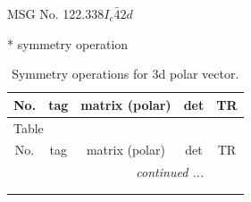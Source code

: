 \documentclass[fleqn,8pt]{jsarticle}
\begin{document}
\setcounter{MaxMatrixCols}{32}

\renewcommand{\tablename}{Table~}
\renewcommand{\figurename}{Figure~}
\begin{center}
\LARGE
MSG No. 122.338\quad$I_{c}\bar{4}2d$
\end{center}
* symmetry operation
\renewcommand{\arraystretch}{1.3}
\begin{longtable}{ccccc}
\caption{Symmetry operations for 3d polar vector.}
 \\
 \hline \hline
No. & tag & matrix (polar) & det & TR \\ \hline \endfirsthead

\multicolumn{4}{l}{\tablename\ \thetable{}} \\
 \hline \hline
No. & tag & matrix (polar) & det & TR \\ \hline \endhead

 \hline \hline
\multicolumn{4}{r}{\footnotesize\it continued ...} \\ \endfoot

 \hline \hline
\multicolumn{4}{r}{} \\ \endlastfoot


\end{longtable}
\end{document}
